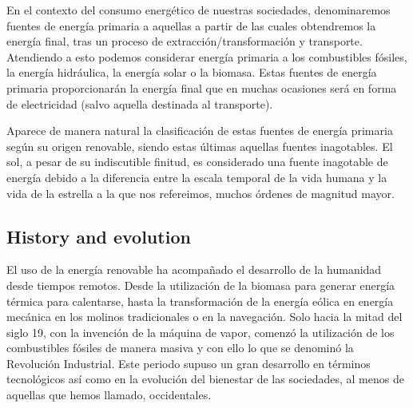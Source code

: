 En el contexto del consumo energético de nuestras sociedades, denominaremos fuentes de energía primaria a aquellas a partir de las cuales obtendremos la energía final, tras un proceso de extracción/transformación y transporte. Atendiendo a esto podemos considerar energía primaria a los combustibles fósiles, la energía hidráulica, la energía solar o la biomasa. Estas fuentes de energía primaria proporcionarán la energía final que en muchas ocasiones será en forma de electricidad (salvo aquella destinada al transporte).



Aparece de manera natural la clasificación de estas fuentes de energía primaria según su origen renovable, siendo estas últimas aquellas fuentes inagotables. El sol, a pesar de su indiscutible finitud,  es considerado una fuente inagotable de energía debido a la diferencia entre la escala temporal de la vida humana y la vida de la estrella a la que nos refereimos, muchos órdenes de magnitud mayor.

\subsection{History and evolution}

El uso de la energía renovable ha acompañado el desarrollo de la humanidad desde tiempos remotos. Desde la utilización de la biomasa para generar energía térmica para calentarse, hasta la transformación de la energía eólica en energía mecánica en los molinos tradicionales o en la navegación. Solo hacia la mitad del siglo 19, con la invención de la máquina de vapor, comenzó la utilización de los combustibles fósiles de manera masiva y con ello lo que se denominó la Revolución Industrial. Este periodo supuso un gran desarrollo en términos tecnológicos así como en la evolución del bienestar de las sociedades, al menos de aquellas que hemos llamado, occidentales.

